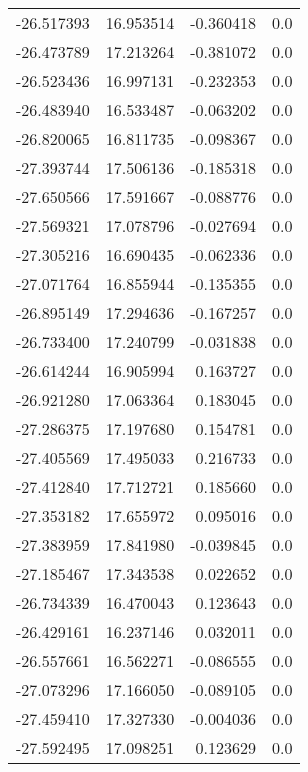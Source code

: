 \begin{tabular}{rrrr}
      -26.517393 &        16.953514 &   -0.360418 &   0.0 \\
      -26.473789 &        17.213264 &   -0.381072 &   0.0 \\
      -26.523436 &        16.997131 &   -0.232353 &   0.0 \\
      -26.483940 &        16.533487 &   -0.063202 &   0.0 \\
      -26.820065 &        16.811735 &   -0.098367 &   0.0 \\
      -27.393744 &        17.506136 &   -0.185318 &   0.0 \\
      -27.650566 &        17.591667 &   -0.088776 &   0.0 \\
      -27.569321 &        17.078796 &   -0.027694 &   0.0 \\
      -27.305216 &        16.690435 &   -0.062336 &   0.0 \\
      -27.071764 &        16.855944 &   -0.135355 &   0.0 \\
      -26.895149 &        17.294636 &   -0.167257 &   0.0 \\
      -26.733400 &        17.240799 &   -0.031838 &   0.0 \\
      -26.614244 &        16.905994 &    0.163727 &   0.0 \\
      -26.921280 &        17.063364 &    0.183045 &   0.0 \\
      -27.286375 &        17.197680 &    0.154781 &   0.0 \\
      -27.405569 &        17.495033 &    0.216733 &   0.0 \\
      -27.412840 &        17.712721 &    0.185660 &   0.0 \\
      -27.353182 &        17.655972 &    0.095016 &   0.0 \\
      -27.383959 &        17.841980 &   -0.039845 &   0.0 \\
      -27.185467 &        17.343538 &    0.022652 &   0.0 \\
      -26.734339 &        16.470043 &    0.123643 &   0.0 \\
      -26.429161 &        16.237146 &    0.032011 &   0.0 \\
      -26.557661 &        16.562271 &   -0.086555 &   0.0 \\
      -27.073296 &        17.166050 &   -0.089105 &   0.0 \\
      -27.459410 &        17.327330 &   -0.004036 &   0.0 \\
      -27.592495 &        17.098251 &    0.123629 &   0.0 \\

\end{tabular}

